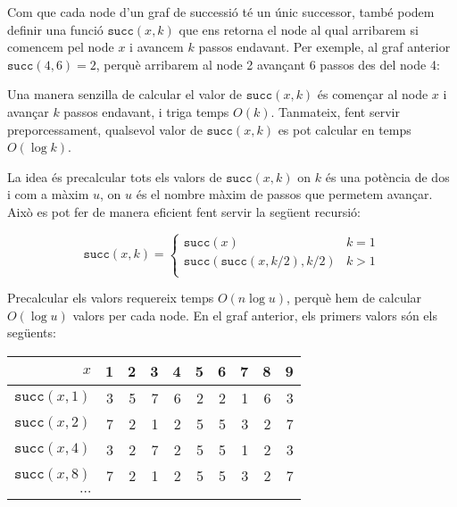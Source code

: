 Com que cada node d'un graf de successió té un únic successor, també
podem definir una funció $\texttt{succ}(x,k)$ que ens retorna el node al
qual arribarem si comencem pel node $x$ i avancem $k$ passos
endavant. Per exemple, al graf anterior $\texttt{succ}(4,6)=2$, perquè
arribarem al node 2 avançant 6 passos des del node 4:


\begin{center}
\end{center}


Una manera senzilla de calcular el valor de $\texttt{succ}(x,k)$ és
començar al node $x$ i avançar $k$ passos endavant, i triga temps
$O(k)$. Tanmateix, fent servir preporcessament, qualsevol valor de
$\texttt{succ}(x,k)$ es pot calcular en temps $O(\log k)$.

La idea és precalcular tots els valors de $\texttt{succ}(x,k)$ on $k$
és una potència de dos i com a màxim $u$, on $u$ és el nombre màxim de
passos que permetem avançar. Això es pot fer de manera eficient fent
servir la següent recursió:


\begin{equation*}
    \texttt{succ}(x,k) = \begin{cases}
               \texttt{succ}(x)              & k = 1\\
               \texttt{succ}(\texttt{succ}(x,k/2),k/2)   & k > 1\\
           \end{cases}
\end{equation*}


Precalcular els valors requereix temps $O(n \log u)$, perquè hem de
calcular $O(\log u)$ valors per cada node. En el graf anterior, els
primers valors són els següents:


\begin{center}
\begin{tabular}{r|rrrrrrrrr}
$x$ & 1 & 2 & 3 & 4 & 5 & 6 & 7 & 8 & 9 \\
\hline
$\texttt{succ}(x,1)$ & 3 & 5 & 7 & 6 & 2 & 2 & 1 & 6 & 3 \\
$\texttt{succ}(x,2)$ & 7 & 2 & 1 & 2 & 5 & 5 & 3 & 2 & 7 \\
$\texttt{succ}(x,4)$ & 3 & 2 & 7 & 2 & 5 & 5 & 1 & 2 & 3 \\
$\texttt{succ}(x,8)$ & 7 & 2 & 1 & 2 & 5 & 5 & 3 & 2 & 7 \\
$\cdots$ \\
\end{tabular}
\end{center}


